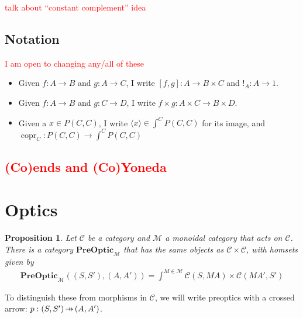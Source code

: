 \documentclass[11pt,a4paper]{article}
\theoremstyle{plain}
\newtheorem{proposition}[theorem]{Proposition}
\theoremstyle{definition}
\newcommand{\C}{\mathscr{C}}
\newcommand{\M}{\mathscr{M}}
\newcommand{\PreOptic}{\mathbf{PreOptic}}
\DeclareMathOperator{\copr}{copr}
\newcommand{\hto}{\ensuremath{\,\mathaccent\shortmid\rightarrow\,}}
\newcommand{\todo}[1]{\textcolor{red}{\small #1}}
\begin{document}
\todo{talk about ``constant complement'' idea}

\subsection{Notation}
\todo{I am open to changing any/all of these}
\begin{itemize}
\item Given $f : A \to B$ and $g : A \to C$, I write $[f, g] : A \to B \times C$ and $!_A : A \to 1$.
\item Given $f : A \to B$ and $g : C \to D$, I write $f \times g : A \times C \to B \times D$.
\item Given a $x \in P(C, C)$, I write $\langle x \rangle \in \int^C P(C, C)$ for its image, and $\copr_C : P(C,C) \to \int^C P(C, C)$
\end{itemize}

\todo{
\subsection{(Co)ends and (Co)Yoneda}
}

\section{Optics}

\begin{proposition}
Let $\C$ be a category and $\M$ a monoidal category that acts on $\C$. There is a category $\PreOptic_\M$ that has the same objects as $\C \times \C$, with homsets given by
\begin{align*}
\PreOptic_\M((S, S'), (A, A')) = \int^{M \in \M} \C(S, M A) \times \C(M A', S')
\end{align*}
\end{proposition}
To distinguish these from morphisms in $\C$, we will write preoptics with a crossed arrow: $p : (S, S') \hto (A, A')$.
\end{document}

